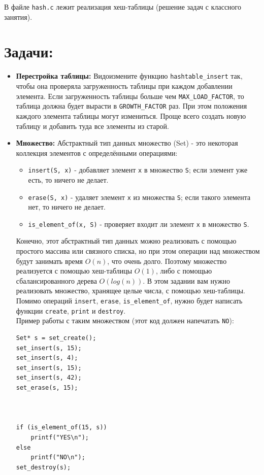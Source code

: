 \documentclass{article}
\begin{document}
В файле \texttt{hash.c} лежит реализация хеш-таблицы (решение задач с классного занятия).
\section*{Задачи:}
\begin{itemize}
\item \textbf{Перестройка таблицы:} Видоизмените функцию \texttt{hashtable\_insert} так, чтобы она проверяла загруженность таблицы при каждом добавлении элемента. Если загруженность таблицы больше чем \texttt{MAX\_LOAD\_FACTOR}, то таблица должна будет вырасти в \texttt{GROWTH\_FACTOR} раз. При этом положения каждого элемента таблицы могут измениться. Проще всего создать новую таблицу и добавить туда все элементы из старой.
\item \textbf{Множество:} Абстрактный тип данных множество (Set) - это некоторая коллекция элементов с определёнными операциями:
	\begin{itemize}
	\item \texttt{insert(S, x)} - добавляет элемент \texttt{x} в множество \texttt{S}; если элемент уже есть, то ничего не делает.
	\item \texttt{erase(S, x)} - удаляет элемент \texttt{x} из множества \texttt{S}; если такого элемента нет, то ничего не делает.
	\item \texttt{is\_element\_of(x, S)} - проверяет входит ли элемент \texttt{x} в множество \texttt{S}.
	\end{itemize}
Конечно, этот абстрактный тип данных можно реализовать с помощью простого массива или связного списка, но при этом операции над множеством будут занимать время $O(n)$, что очень долго. Поэтому множество реализуется с помощью хеш-таблицы $O(1)$, либо с помощью сбалансированного дерева $O(log(n))$. 
В этом задании вам нужно реализовать множество, хранящее целые числа, с помощью хеш-таблицы. Помимо операций \texttt{insert}, \texttt{erase}, \texttt{is\_element\_of}, нужно будет написать функции \texttt{create}, \texttt{print} и \texttt{destroy}. \\
Пример работы с таким множеством (этот код должен напечатать \texttt{NO}):
\begin{multicols}{1}
\begin{lstlisting}
Set* s = set_create();
set_insert(s, 15);
set_insert(s, 4);
set_insert(s, 15);
set_insert(s, 42);
set_erase(s, 15);



if (is_element_of(15, s))
	printf("YES\n");
else
	printf("NO\n");
set_destroy(s);



\end{lstlisting}
\end{multicols}
\end{itemize}
\end{document}
